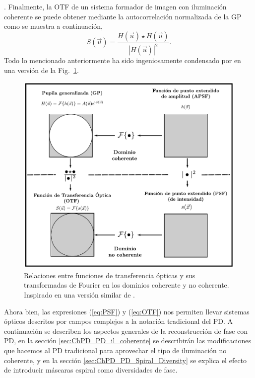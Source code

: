 . Finalmente, la OTF de un sistema formador de
imagen con iluminación coherente se puede obtener mediante la
autocorrelación normalizada de la GP como se muestra a continuación,
\begin{equation}\label{eq:OTF}
S(\vec{u}) = \frac{H(\vec{u}) \star H(\vec{u})}{|H(\vec{u})|^2}.
\end{equation}
Todo lo mencionado anteriormente ha sido ingeniosamente condensado por
 en una versión de la Fig.~\ref{fig:ChPD_kernels_sistemas_formadores_de_imagen}. 
\begin{figure}[h!]
\centering
\includegraphics[scale=.8]{kernels_sistemas_formadores_de_imagen.pdf}
\caption[Relaciones entre funciones de transferencia ópticas y sus FT.]{Relaciones entre funciones de transferencia ópticas y sus
  transformadas de Fourier en los dominios coherente y no
  coherente. Inspirado en una versión similar de .}
\label{fig:ChPD_kernels_sistemas_formadores_de_imagen}
\end{figure} 
Ahora bien, las expresiones (\ref{eq:PSF}) y (\ref{eq:OTF}) nos
permiten llevar sistemas ópticos descritos por campos complejos a la
notación tradicional del PD. A continuación se describen los aspectos
 generales de la reconstrucción de fase con PD, en la sección
 \ref{sec:ChPD_PD_il_coherente} se describirán las modificaciones que
 hacemos al PD tradicional para aprovechar el tipo de iluminación no
 coherente, y en la sección \ref{sec:ChPD_PD_Spiral_Diversity} se
 explica el efecto de introducir máscaras espiral como diversidades de
 fase. 

